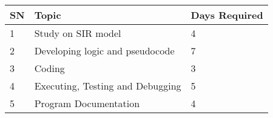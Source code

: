 \documentclass[a4paper, 12pt]{article}
\begin{document}
\begin{center}
\begin{tabular}{ | m{1cm} | m{10cm}| m{2cm} | } 
  \hline
  SN & Topic & Days Required \\ 
  \hline
  1 & Study on SIR model & 4 \\ 
  \hline
  2 & Developing logic and pseudocode & 7 \\ 
  \hline
  3 & Coding & 3 \\ 
  \hline
  4 & Executing, Testing and Debugging & 5 \\ 
  \hline
  5 & Program Documentation & 4 \\ 
  \hline
\end{tabular}
\end{center}
\end{document}
